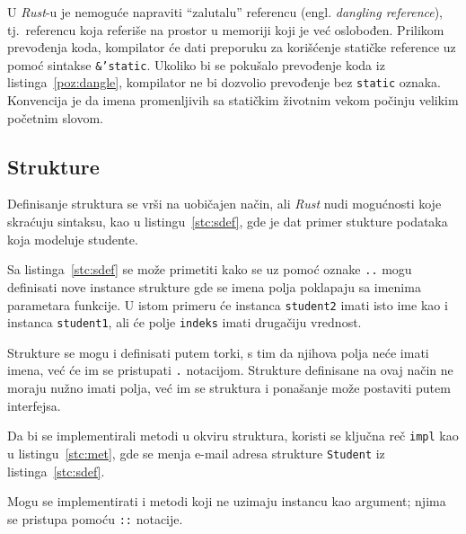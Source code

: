 \documentclass[12pt,oneside]{memoir}
\begin{document}
U \emph{Rust}-u je nemoguće napraviti ``zalutalu'' referencu (engl. \emph{dangling reference}),
tj.\ referencu koja referiše na prostor u memoriji koji je već oslobođen. Prilikom prevođenja
koda, kompilator će dati preporuku za korišćenje statičke reference uz pomoć sintakse
\texttt{\&'static}. Ukoliko bi se pokušalo prevođenje koda iz listinga~\ref{poz:dangle},
kompilator ne bi dozvolio prevođenje bez \texttt{static} oznaka. Konvencija je da imena
promenljivih sa statičkim životnim vekom počinju velikim početnim slovom.



\subsection{Strukture}
Definisanje struktura se vrši na uobičajen način, ali \emph{Rust} nudi mogućnosti koje skraćuju
sintaksu, kao u listingu~\ref{stc:sdef}, gde je dat primer stukture podataka koja modeluje
studente.



Sa listinga~\ref{stc:sdef} se može primetiti kako se uz pomoć oznake \texttt{..} mogu definisati
nove instance strukture gde se imena
polja poklapaju sa imenima parametara funkcije. U istom primeru će instanca \texttt{student2}
imati isto ime kao i instanca \texttt{student1}, ali će polje \texttt{indeks} imati
drugačiju vrednost.

Strukture se mogu i definisati putem torki, s tim da njihova polja neće imati imena, već će
im se pristupati \texttt{.} notacijom. Strukture definisane na ovaj način ne moraju nužno imati
polja, već im se struktura i ponašanje može postaviti putem interfejsa.

Da bi se implementirali metodi u okviru struktura, koristi se ključna reč \texttt{impl} kao u
listingu~\ref{stc:met}, gde se menja e-mail adresa strukture \texttt{Student} iz
listinga~\ref{stc:sdef}.



\noindent
Mogu se implementirati i metodi koji ne uzimaju instancu kao argument; njima se pristupa pomoću
\texttt{::} notacije.
\end{document}

